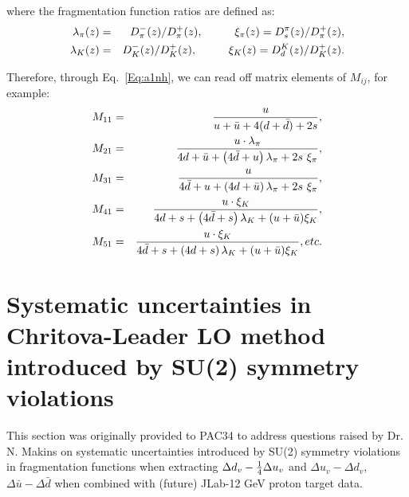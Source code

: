 where the fragmentation function ratios are defined as:
\begin{eqnarray}
\lambda_{\pi}(z)  & = & D_{\pi}^-(z)/D_{\pi}^+(z), 
\hspace{1.0cm} \xi_{\pi}(z)=D_{s}^{\pi}(z)/D_{\pi}^+(z), \nonumber \\
\lambda_{K}(z) & = & D_{K}^-(z)/D_{K}^+(z),
\hspace{1.0cm} \xi_{K}(z)=D_{d}^{K}(z)/D_{K}^+(z).
\end{eqnarray}  

Therefore, through Eq.~\ref{Eq:a1nh}, we can read off matrix elements of $M_{ij}$, for example:
 \begin{eqnarray}
\label{Eq:mij}
M_{11} & = & 
{ u 
\over u  + {\bar u} + 4(d+\bar{d} )+ 2s },  \nonumber  \\
M_{21} & = & 
{  u \cdot  \lambda_{\pi} 
\over 4d  + {\bar u} + \left(4{\bar d} + u \right)  \lambda_{\pi} + 
2 s \ \xi_{\pi}},  \nonumber  \\
M_{31} & = & 
{   u 
\over 4\bar{d}  + u + \left(4 d + \bar{u} \right)  \lambda_{\pi} + 
2 s \ \xi_{\pi}},  \nonumber  \\
M_{41} & = & 
{   u \cdot  \xi_{K}
\over 4d  + s + \left(4{\bar d} + s \right)  \lambda_{K} + 
(u+\bar{u})  \xi_{K}}, \nonumber  \\
M_{51} & = & 
{  u \cdot  \xi_{K}
\over 4\bar{d}  + s + \left(4d + s \right)  \lambda_{K} + 
(u+\bar{u})  \xi_{K}},  etc. 
\end{eqnarray}


\section{Systematic uncertainties in Chritova-Leader LO method introduced by SU(2) symmetry 
violations }

This section was originally provided to PAC34 to address questions raised by Dr. N. Makins  on systematic uncertainties introduced by 
SU(2) symmetry violations in fragmentation functions 
when extracting  $\Delta d_v - {1 \over 4} \Delta u_v$ and $\Delta u_v - \Delta d_v$, $\Delta \bar{u} - \Delta \bar{d}$
when combined with (future) JLab-12 GeV  proton target data. 


